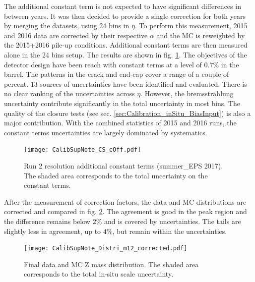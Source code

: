 The additional constant term is not expected to have significant differences in between years.
It was then decided to provide a single correction for both years by merging the datasets, using 24 bins in $\eta$.
To perform this measurement, 2015 and 2016 data are corrected by their respective $\alpha$ and the MC is reweighted by the 2015+2016 pile-up conditions.
Additional constant terms are then measured alone in the 24 bins setup.
The results are shown in fig. \ref{fig:org3657743}.
The objectives of the detector design have been reach with constant terms at a level of $0.7\%$ in the barrel.
The patterns in the crack and end-cap cover a range of a couple of percent.
13 sources of uncertainties have been identified and evaluated.
There is no clear ranking of the uncertainties across $\eta$.
However, the bremsstrahlung uncertainty contribute significantly in the total uncertainty in most bins.
The quality of the closure tests (see sec. \ref{sec:Calibration_inSitu_BiasInput}) is also a major contribution.
With the combined statistics of 2015 and 2016 runs, the constant terms uncertainties are largely dominated by systematics.

\begin{figure}[htbp]
\centering
\texttt{[image: CalibSupNote\_CS\_cOff.pdf]}
\caption{\label{fig:org3657743}
  Run 2 resolution additional constant terms (summer\_EPS 2017).
  The shaded area corresponds to the total uncertainty on the constant terms.
  \cite{EPSCalib}}
\end{figure}

After the measurement of correction factors, the data and MC distributions are corrected and compared in fig. \ref{fig:Calibration_ZMassPostCalib}.
The agreement is good in the peak region and the difference remains below $2\%$ and is covered by uncertainties.
The tails are slightly less in agreement, up to $4\%$, but remain within the uncertainties.

\begin{figure}[htbp]
\centering
\texttt{[image: CalibSupNote\_Distri\_m12\_corrected.pdf]}
\caption{\label{fig:Calibration_ZMassPostCalib}
  Final data and MC Z mass distribution.
  The shaded area corresponds to the total in-situ scale uncertainty.}
\end{figure}



